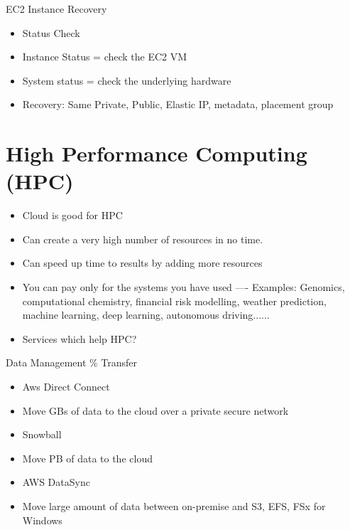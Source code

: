 EC2 Instance Recovery
\begin{itemize}
    \item Status Check
    \item Instance Status = check the EC2 VM
    \item System status = check the underlying hardware
    \item Recovery: Same Private, Public, Elastic IP, metadata, placement group
\end{itemize}


\section{High Performance Computing (HPC)}
\begin{itemize}
    \item Cloud is good for HPC
    \item Can create a very high number of resources in no time.
    \item Can speed up time to results by adding more resources
    \item You can pay only for the systems you have used
    ---- Examples: Genomics, computational chemistry, financial risk modelling, weather prediction, machine learning, deep learning, autonomous driving......
    \item Services which help HPC?
\end{itemize}

Data Management \% Transfer
\begin{itemize}
    \item Aws Direct Connect
    \item Move GBs of data to the cloud over a private secure network
    \item Snowball
    \item Move PB of data to the cloud
    \item AWS DataSync
    \item Move large amount of data between on-premise and S3, EFS, FSx for Windows
\end{itemize}

